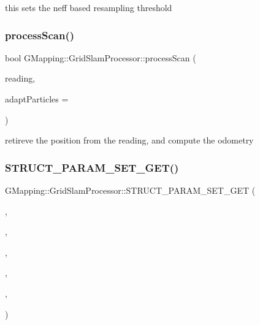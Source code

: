 this sets the neff based resampling threshold \mbox{\label{classGMapping_1_1GridSlamProcessor_a34c7f216947ee4c8ac05d5a53366aa5d}} 
\subsubsection{\texorpdfstring{process\+Scan()}{processScan()}}
{\footnotesize\ttfamily bool G\+Mapping\+::\+Grid\+Slam\+Processor\+::process\+Scan (\begin{DoxyParamCaption}\item[{const \hyperlink{classGMapping_1_1RangeReading}{Range\+Reading} \&}]{reading,  }\item[{int}]{adapt\+Particles = {} }\end{DoxyParamCaption})}

retireve the position from the reading, and compute the odometry \mbox{\label{classGMapping_1_1GridSlamProcessor_a5dca255f4b499a703a002715fd70828e}} 
\subsubsection{\texorpdfstring{S\+T\+R\+U\+C\+T\+\_\+\+P\+A\+R\+A\+M\+\_\+\+S\+E\+T\+\_\+\+G\+E\+T()}{STRUCT\_PARAM\_SET\_GET()}\hspace{0.1cm}{\footnotesize\ttfamily [1/4]}}
{\footnotesize\ttfamily G\+Mapping\+::\+Grid\+Slam\+Processor\+::\+S\+T\+R\+U\+C\+T\+\_\+\+P\+A\+R\+A\+M\+\_\+\+S\+E\+T\+\_\+\+G\+ET (\begin{DoxyParamCaption}\item[{\hyperlink{classGMapping_1_1GridSlamProcessor_ae1fa20e9679abdbc23784e2dc17194b5}{m\+\_\+motion\+Model}}]{,  }\item[{double}]{,  }\item[{srr}]{,  }\item[{protected}]{,  }\item[{public}]{,  }\item[{public}]{ }\end{DoxyParamCaption})}

